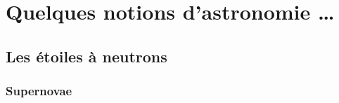 \documentclass[11pt]{book} %
\begin{document}
\usechapterimagefalse%


\pagestyle{empty} %

\tableofcontents %

\cleardoublepage%

\pagestyle{fancy} %





\chapter{Quelques notions d'astronomie \ldots}


\section{Les étoiles à neutrons}

\subsection{Supernovae\label{supernova}}
\end{document}

